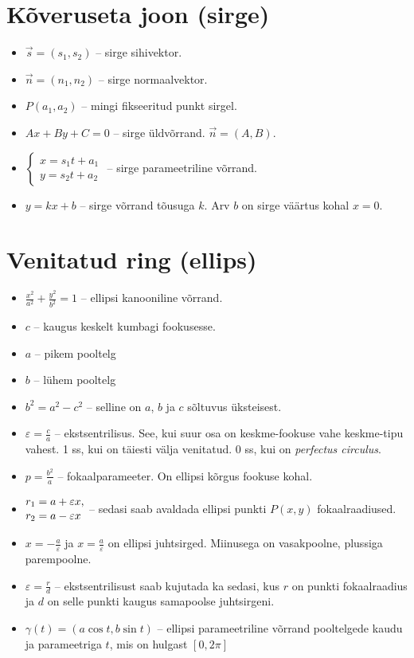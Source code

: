 \documentclass{article}
\begin{document}
	\begin{preview}
		\section*{Kõveruseta joon (sirge)}
		\begin{itemize}
			\item $\vec{s} = (s_1, s_2)$ – sirge sihivektor.
			\item $\vec{n} = (n_1, n_2)$ – sirge normaalvektor.
			\item $P(a_1, a_2)$ – mingi fikseeritud punkt sirgel.
			\item $Ax + By + C = 0$ – sirge üldvõrrand. $\vec{n} = (A, B)$.
			\item $\left\{
			\begin{aligned}
				x = s_1t + a_1 \\[-2pt] y = s_2 t + a_2
			\end{aligned}
			\right.$ – sirge parameetriline võrrand.
			\item $y = kx + b$ – sirge võrrand tõusuga $k$. Arv $b$ on sirge väärtus kohal $x = 0$.
		\end{itemize}
		\section*{Venitatud ring (ellips)}
		\begin{itemize}
			\item $\frac{x^2}{a^2} + \frac{y^2}{b^2} = 1$ – ellipsi kanooniline võrrand.
			\item $c$ – kaugus keskelt kumbagi fookusesse.
			\item $a$ – pikem pooltelg
			\item $b$ – lühem pooltelg
			\item $b^2 = a^2 - c^2$ – selline on $a$, $b$ ja $c$ sõltuvus üksteisest.
			\item $\varepsilon = \frac{c}{a}$ – ekstsentrilisus. See, kui suur osa on keskme-fookuse vahe keskme-tipu vahest. 1 ss, kui on täiesti välja venitatud. 0 ss, kui on \emph{perfectus circulus}.
			\item $p = \frac{b^2}{a}$ – fokaalparameeter. On ellipsi kõrgus fookuse kohal.
			\item $\begin{aligned}
				r_1 &= a + \varepsilon x, \vspace{-100pt} \\[-2pt]
				r_2 &= a - \varepsilon x
			\end{aligned}$ – sedasi saab avaldada ellipsi punkti $P(x,y)$ fokaalraadiused.
			\item $x = -\frac{a}{\varepsilon}$\; ja\; $x = \frac{a}{\varepsilon}$\; on ellipsi juhtsirged. Miinusega on vasakpoolne, plussiga parempoolne.
			\item $\varepsilon = \frac{r}{d}$ – ekstsentrilisust saab kujutada ka sedasi, kus $r$ on punkti fokaalraadius ja $d$ on selle punkti kaugus samapoolse juhtsirgeni. 
			\item $\gamma(t) = (a \cos{t}, b \sin{t})$ – ellipsi parameetriline võrrand pooltelgede kaudu ja parameetriga $t$, mis on hulgast $\left[0, 2\pi\right]$
		\end{itemize}
		

\end{preview}
\end{document}
